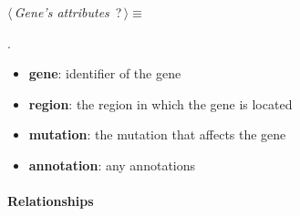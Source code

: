 	\begin{flushleft} \small
\begin{minipage}{\linewidth}\label{scrap6}\raggedright\small
{} $\langle\,${\itshape {Gene's attributes}}\nobreak\ {\footnotesize {?}}$\,\rangle\equiv$
\vspace{-1ex}
\begin{list}{}{} \item

                
        {\NWsep}
\end{list}
\vspace{-1.5ex}
\footnotesize
\begin{list}{}{\setlength{\itemsep}{-\parsep}\setlength{\itemindent}{-\leftmargin}}
\item {\NWtxtMacroNoRef}.

\item{}
\end{list}
\end{minipage}\vspace{4ex}
\end{flushleft}
\begin{itemize}
 	\item \textbf{gene}: identifier of the gene
 	\item \textbf{region}: the region in which the gene is located
 	\item \textbf{mutation}: the mutation that affects the gene
 	\item \textbf{annotation}: any annotations
\end{itemize}

\newpage

\paragraph{Relationships} 

